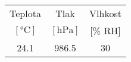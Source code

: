 \begin{tabular}{ccc}                                                    \toprule
Teplota                 &   Tlak                    &   Vlhkost     \\
$[\si{\degreeCelsius}]$ &   $[\si{\hecto\pascal}]$  &   [\% RH]     \\  \midrule
24.1                    &   986.5                   &   30          \\  \bottomrule
\end{tabular}